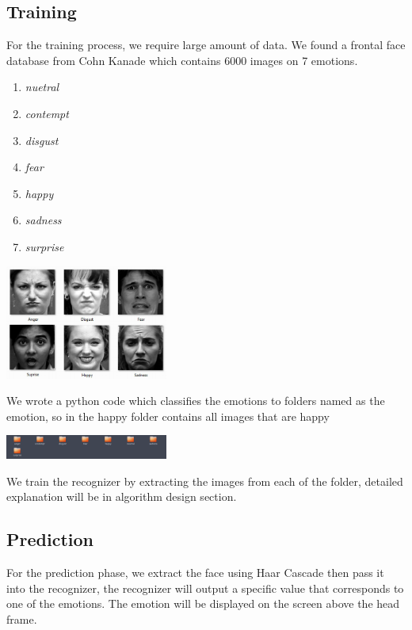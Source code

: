 \documentclass[11pt,journal]{IEEEtran}
\begin{document}
    \subsection{Training}
      For the training process, we require large amount of data. We found a frontal face database from Cohn Kanade which contains $6000$ images on 7 emotions.

      \begin{enumerate}
        \item \textit{nuetral}
        \item \textit{contempt}
        \item \textit{disgust}
        \item \textit{fear}
        \item \textit{happy}
        \item \textit{sadness}
        \item \textit{surprise}
      \end{enumerate}

      \includegraphics[width=0.4\textwidth]{02.png}

      We wrote a python code which classifies the emotions to folders named as the emotion, so in the happy folder contains all images that are happy

      \includegraphics[width=0.4\textwidth]{03.png}

      We train the recognizer by extracting the images from each of the folder, detailed explanation will be in algorithm design section.

    \subsection{Prediction}
      For the prediction phase, we extract the face using Haar Cascade then pass it into the recognizer, the recognizer will output a specific value that corresponds to one of the emotions. The emotion will be displayed on the screen above the head frame.
\end{document}
